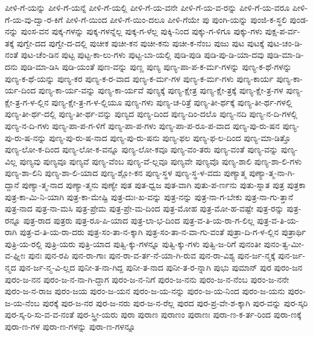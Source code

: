 {ಪೀಳಿ-ಗೆ-ಯನ್ನು
ಪೀಳಿ-ಗೆ-ಯನ್ನೆ
ಪೀಳಿ-ಗೆ-ಯಲ್ಲಿ
ಪೀಳಿ-ಗೆ-ಯ-ವನೇ
ಪೀಳಿ-ಗೆ-ಯ-ವ-ರನ್ನು
ಪೀಳಿ-ಗೆ-ಯ-ವರೂ
ಪೀಳಿ-ಗೆ-ಯ-ವು-ದ್ವಾ-ರ-ಕಿಗೆ
ಪೀಳಿ-ಗೆ-ಯಿಂದ
ಪೀಳಿ-ಗೆ-ಯಿಂ-ದಲೂ
ಪೀಳಿ-ಗೆಯೇ
ಪು
ಪುಂಗಿ-ಯನ್ನು
ಪುಂಜಿ-ಕ-ಸ್ಥಲಿ
ಪುಂಡ-ನನ್ನು
ಪುಂಸ-ವನ
ಪುಕ್ಕ-ಗಳನ್ನು
ಪುಕ್ಕ-ಗಳನ್ನೆಲ್ಲ
ಪುಕ್ಕ-ಗ-ಳೆಲ್ಲ
ಪುಕ್ಕಿ-ನಿಂದ
ಪುಕ್ಕು-ಗ-ಳಿಗೂ
ಪುಕ್ಕು-ಗಳು
ಪುಕ್ಷ-ಪ-ರ್ವ-ತಕ್ಕೆ
ಪುಗ್ವೇ-ದದ
ಪುಗ್ವೇ-ದ-ದಲ್ಲಿ
ಪುಚೀಕ
ಪುಚೀ-ಕನ
ಪುಚೀ-ಕನು
ಪುಚೀ-ಕ-ನೆಂಬ
ಪುಜು
ಪುಟ
ಪುಟಕ್ಕೆ
ಪುಟ-ಚಂ-ಡಿ-ನಂತೆ
ಪುಟ-ಚೆಂ-ಡಿನ
ಪುಟ್ಟ
ಪುಟ್ಟ-ಕಾ-ಲು-ಗಳು
ಪುಟ್ಟ-ಬಾ-ಯಲ್ಲಿ
ಪುಡಿ-ಪುಡಿ
ಪುಡಿ-ಪು-ಡಿ-ಯಾ-ದವು
ಪುಡಿ-ಮಾ-ಡಿ-ದನು
ಪುಡಿ-ಮಾ-ಡಿಸಿ
ಪುಡಿ-ಯಂತೆ
ಪುಣ-ವನ್ನು
ಪುಣ್ಣ
ಪುಣ್ಯ
ಪುಣ್ಯ-ಪಾ-ಪ-ಕ-ರ್ಮ-ಗಳನ್ನು
ಪುಣ್ಯ-ಕ-ಥೆ-ಗಳನ್ನು
ಪುಣ್ಯ-ಕ-ಥೆ-ಯನ್ನು
ಪುಣ್ಯ-ಕರ
ಪುಣ್ಯ-ಕ-ರ-ವಾದ
ಪುಣ್ಯ-ಕ-ರ್ಮ-ಗಳ
ಪುಣ್ಯ-ಕ-ರ್ಮ-ಗಳು
ಪುಣ್ಯ-ಕಾರ್ಯ
ಪುಣ್ಯ-ಕಾ-ರ್ಯ-ದಿಂದ
ಪುಣ್ಯ-ಕಾ-ರ್ಯ-ವನ್ನು
ಪುಣ್ಯ-ಕಾ-ರ್ಯವೆ
ಪುಣ್ಯಕ್ಕೆ
ಪುಣ್ಯ-ಕ್ಷೇತ್ರ
ಪುಣ್ಯ-ಕ್ಷೇ-ತ್ರಕ್ಕೆ
ಪುಣ್ಯ-ಕ್ಷೇ-ತ್ರ-ಗಳ
ಪುಣ್ಯ-ಕ್ಷೇ-ತ್ರ-ಗ-ಳ-ಲ್ಲಿನ
ಪುಣ್ಯ-ಕ್ಷೇ-ತ್ರ-ಗ-ಳ-ಲ್ಲಿಯೂ
ಪುಣ್ಯ-ಗಳು
ಪುಣ್ಯ-ಚ-ರಿತ್ರೆ
ಪುಣ್ಯ-ತೀ-ರ್ಥಕ್ಕೆ
ಪುಣ್ಯ-ತೀ-ರ್ಥ-ಗಳಲ್ಲಿ
ಪುಣ್ಯ-ತೀ-ರ್ಥ-ದಲ್ಲಿ
ಪುಣ್ಯ-ತೀ-ರ್ಥ-ವನ್ನು
ಪುಣ್ಯದ
ಪುಣ್ಯ-ದಿಂದ
ಪುಣ್ಯ-ದಿಂ-ದಲೊ
ಪುಣ್ಯ-ನದಿ
ಪುಣ್ಯ-ನ-ದಿ-ಗಳಲ್ಲಿ
ಪುಣ್ಯ-ನ-ದಿ-ಗಳು
ಪುಣ್ಯ-ಪಾ-ಪ-ಗ-ಳಿಗೆ
ಪುಣ್ಯ-ಪಾ-ಪ-ಗಳು
ಪುಣ್ಯ-ಪಾ-ಪ-ರೂ-ಪ-ವಾದ
ಪುಣ್ಯ-ಪು-ರು-ಷನ
ಪುಣ್ಯ-ಪು-ರು-ಷ-ನನ್ನು
ಪುಣ್ಯ-ಪು-ರು-ಷ-ನಾದ
ಪುಣ್ಯ-ಪು-ರು-ಷನು
ಪುಣ್ಯ-ಫಲ
ಪುಣ್ಯ-ಫ-ಲ-ದಿಂದ
ಪುಣ್ಯ-ಮಾ-ಡಿತ್ತೊ
ಪುಣ್ಯ-ಲೋ-ಕ-ದಿಂದ
ಪುಣ್ಯ-ಲೋ-ಕ-ವನ್ನೂ
ಪುಣ್ಯ-ಲೋ-ಕವೂ
ಪುಣ್ಯ-ವಂ-ತರು
ಪುಣ್ಯ-ವಂತೆ
ಪುಣ್ಯ-ವನ್ನು
ಪುಣ್ಯ-ವಿಲ್ಲ
ಪುಣ್ಯವು
ಪುಣ್ಯವೂ
ಪುಣ್ಯವೆ
ಪುಣ್ಯ-ವೆಂಬ
ಪುಣ್ಯ-ವೆ-ಲ್ಲವೂ
ಪುಣ್ಯವೇ
ಪುಣ್ಯವೊ
ಪುಣ್ಯ-ಶಾಲಿ
ಪುಣ್ಯ-ಶಾ-ಲಿ-ಗಳು
ಪುಣ್ಯ-ಶಾ-ಲಿನಿ
ಪುಣ್ಯ-ಶಾ-ಲಿ-ಯಾದ
ಪುಣ್ಯ-ಶ್ಲೋ-ಕನ
ಪುಣ್ಯ-ಸ್ಥಳ
ಪುಣ್ಯ-ಸ್ಥ-ಳ-ವದು
ಪುಣ್ಯಾತ್ಮ
ಪುಣ್ಯಾ-ತ್ಮ-ನಾ-ಗಿ-ದ್ದಾನೆ
ಪುಣ್ಯಾ-ತ್ಮ-ನಾದ
ಪುಣ್ಯಾ-ತ್ಮನು
ಪುಣ್ಯೇ
ಪುತ
ಪುತ-ಧ್ವಜ
ಪುತ-ವಾಗಿ
ಪುತು-ಪ-ರ್ಣನು
ಪುತು-ಸ್ನಾತ
ಪುತ್ರ
ಪುತ್ರಕಾ
ಪುತ್ರ-ಕಾ-ಮಿ-ನಿ-ಯಾಗಿ
ಪುತ್ರ-ಕಾ-ಮೇಷ್ಟಿ
ಪುತ್ರ-ದುಃ-ಖ-ವನ್ನು
ಪುತ್ರ-ನನ್ನು
ಪುತ್ರ-ನಾ-ಗ-ಬೇಕು
ಪುತ್ರ-ನಾ-ಗು-ತ್ತಾನೆ
ಪುತ್ರ-ನಾದ
ಪುತ್ರ-ನಾ-ಮಸಿ
ಪುತ್ರ-ಪ್ರೇಮ
ಪುತ್ರ-ಪ್ರೇ-ಮ-ದಿಂದ
ಪುತ್ರ-ಮೋಹ
ಪುತ್ರ-ಮೋ-ಹ-ವಷ್ಟೇ
ಪುತ್ರ-ರನ್ನು
ಪುತ್ರ-ರನ್ನೂ
ಪುತ್ರ-ರಾದ
ಪುತ್ರರು
ಪುತ್ರ-ರೂ-ಪಿ-ಯಾದ
ಪುತ್ರ-ಲಾ-ಭ-ದಿಂದ
ಪುತ್ರ-ವ-ತಿ-ಯ-ರಾ-ಗ-ಲಿಲ್ಲ
ಪುತ್ರ-ವ-ತಿ-ಯ-ರಾಗಿ
ಪುತ್ರ-ವ-ತಿ-ಯ-ರಾ-ದರು
ಪುತ್ರ-ಸಂ-ತಾ-ನ-ಕ್ಕಾಗಿ
ಪುತ್ರ-ಸಂ-ತಾ-ನ-ವಾ-ಗು-ವಂತೆ
ಪುತ್ರಾ-ದಿ-ಗ-ಳ-ಲ್ಲಿನ
ಪುತ್ರಾರ್ಥಿ
ಪುತ್ರಿ-ಯ-ರಲ್ಲಿ
ಪುತ್ರಿ-ಯರು
ಪುತ್ರಿ-ಯಾದ
ಪುತ್ವಿ-ಕ್ಕು-ಗಳನ್ನೂ
ಪುತ್ವಿ-ಕ್ಕು-ಗಳು
ಪುತ್ವಿ-ಜ-ರಿಗೆ
ಪುನಂತೀ
ಪುನಂ-ತ್ವ-ಮೀ-ವ-ಘ್ನೀಃ
ಪುನಃ
ಪುನ-ರಪಿ
ಪುನ-ರಾ-ಗಾಃ
ಪುನ-ರಾ-ವ-ರ್ತ-ನೆ-ಯಾ-ಗಿ-ರುವ
ಪುನ-ರಾ-ವಿಶ್ಯ
ಪುನ-ರ್ಜ-ನ್ಮಕ್ಕೆ
ಪುನ-ರ್ಜ-ನ್ಮದ
ಪುನ-ರ್ಜ-ನ್ಮ-ವಿ-ಲ್ಲದ
ಪುನೀ-ತ-ನಾ-ಗಿದ್ದ
ಪುನೀ-ತ-ನಾದ
ಪುನೀ-ತ-ರ-ನ್ನಾಗಿ
ಪುಭು
ಪುಮಾನ್
ಪುರ
ಪುರಂ-ಜನ
ಪುರಂ-ಜ-ನನ
ಪುರಂ-ಜ-ನ-ನಾ-ಗಿ-ದ್ದಾಗ
ಪುರಂ-ಜ-ನ-ನಿಗೆ
ಪುರಂ-ಜ-ನನು
ಪುರಂ-ಜ-ನ-ನೆಂಬ
ಪುರಂ-ಜ-ನನೇ
ಪುರಂ-ಜ-ನ-ರಾಜ
ಪುರಂ-ಜಯ
ಪುರಂ-ಜ-ಯನ
ಪುರಂ-ಜ-ಯ-ನನ್ನು
ಪುರಂ-ಜ-ಯ-ನಿಂದ
ಪುರಂ-ಜ-ಯನು
ಪುರಂ-ಜ-ಯ-ನೆಂಬ
ಪುರಕ್ಕೆ
ಪುರ-ಜ-ನರ
ಪುರ-ಜ-ನರು
ಪುರ-ಜ-ನ-ರೆಲ್ಲ
ಪುರದ
ಪುರ-ಪ್ರ-ವೇ-ಶ-ಕ್ಕಾಗಿ
ಪುರ-ವನ್ನು
ಪುರ-ಸ್ಕರಿ
ಪುರ-ಸ್ಕ-ರಿ-ಸು-ವ-ವ-ನಂತೆ
ಪುರ-ಸ್ತ್ರೀ-ಯರು
ಪುರಾ
ಪುರಾಣ
ಪುರಾಣಂ
ಪುರಾಣಃ
ಪುರಾ-ಣ-ಕ-ರ್ತ-ರಿಂದ
ಪುರಾ-ಣಕ್ಕೆ
ಪುರಾ-ಣ-ಗಳ
ಪುರಾ-ಣ-ಗಳನ್ನು
ಪುರಾ-ಣ-ಗಳನ್ನೂ
}
